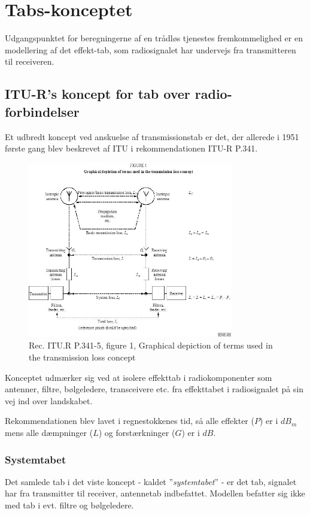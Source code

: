 \chapter{Tabs-konceptet}
Udgangspunktet for beregningerne af en trådløs tjenestes fremkommelighed er en modellering af det effekt-tab, som radiosignalet har undervejs fra transmitteren til receiveren.
\section{ITU-R's koncept for tab over radio-forbindelser}
Et udbredt koncept ved anskuelse af transmissionstab er det, der allerede i 1951 første gang blev beskrevet af ITU i rekommendationen ITU-R P.341\cite{itur_p341-5}.

\begin{figure}[h]
	\centering
	\includegraphics[width=0.8\textwidth]{figure/itur,P341-5,fig01.JPG}
	\caption{Rec. ITU.R P.341-5, figure 1, Graphical depiction of terms used in the transmission loss concept}
	\label{fig:tabskonceptet}
\end{figure}

Konceptet udmærker sig ved at isolere effekttab i radiokomponenter som antenner, filtre, bølgeledere, transceivere etc. fra effekttabet i radiosignalet på sin vej ind over landskabet.

Rekommendationen blev lavet i regnestokkenes tid, så alle effekter ($P$) er i $dB_m$ mens alle dæmpninger ($L$) og forstærkninger ($G$) er i $dB$.

\subsection{Systemtabet}
Det samlede tab i det viste koncept - kaldet ''\emph{systemtabet}'' - er det tab, signalet har fra transmitter til receiver, antennetab indbefattet. Modellen befatter sig ikke med tab i evt. filtre og bølgeledere. 

